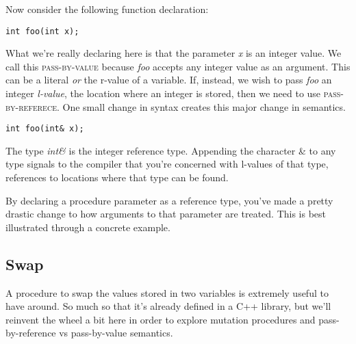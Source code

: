 \documentclass[]{tufte-handout}
\begin{document}
Now consider the following function declaration:
\begin{verbatim}
int foo(int x);
\end{verbatim} 
What we're really declaring here is that the parameter \textit{x} is an integer value. We call this \textsc{pass-by-value} because \textit{foo} accepts any integer value as an argument. This can be a literal \textit{or} the r-value of a variable. If, instead, we wish to pass \textit{foo} an integer \textit{l-value}, the location where an integer is stored, then we need to use \textsc{pass-by-referece}. One small change in syntax creates this major change in semantics.
\begin{verbatim}
int foo(int& x);
\end{verbatim}
The type \textit{int\&} is the integer reference type. Appending the character \& to any type signals to the compiler that you're concerned with l-values of that type, references to locations where that type can be found. 

By declaring a procedure parameter as a reference type, you've made a pretty drastic change to how arguments to that parameter are treated.  This is best illustrated through a concrete example.

\subsection{Swap}

A procedure to swap the values stored in two variables is extremely useful to have around. So much so that it's already defined in a C++ library, but we'll reinvent the wheel a bit here in order to explore mutation procedures and pass-by-reference vs pass-by-value semantics. 
\end{document}
